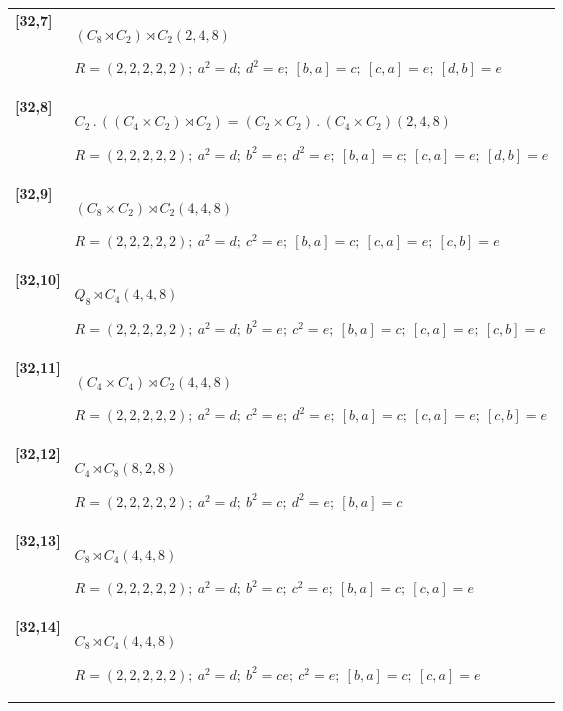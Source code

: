 \documentclass[UTF8,fontset=fandol,11pt,a4paper]{ctexart}
\begin{document}
\begin{longtable}{@{}p{17mm}>{\raggedright\arraybackslash}p{141mm}@{}}
\textbf{[32,7]} & $(C_{8}\rtimes C_{2})\rtimes C_{2}$\quad $(2,4,8)$\par\(R=(2,2,2,2,2);\allowbreak\ a^{2}=d;\allowbreak\ d^{2}=e;\allowbreak\ [b,a]=c;\allowbreak\ [c,a]=e;\allowbreak\ [d,b]=e\)\\[3pt]

\textbf{[32,8]} & $C_{2}\mathbin{.} ((C_{4}\times C_{2})\rtimes C_{2}) = (C_{2}\times C_{2})\mathbin{.} (C_{4}\times C_{2})$\quad $(2,4,8)$\par\(R=(2,2,2,2,2);\allowbreak\ a^{2}=d;\allowbreak\ b^{2}=e;\allowbreak\ d^{2}=e;\allowbreak\ [b,a]=c;\allowbreak\ [c,a]=e;\allowbreak\ [d,b]=e\)\\[3pt]

\textbf{[32,9]} & $(C_{8}\times C_{2})\rtimes C_{2}$\quad $(4,4,8)$\par\(R=(2,2,2,2,2);\allowbreak\ a^{2}=d;\allowbreak\ c^{2}=e;\allowbreak\ [b,a]=c;\allowbreak\ [c,a]=e;\allowbreak\ [c,b]=e\)\\[3pt]

\textbf{[32,10]} & $Q_{8}\rtimes C_{4}$\quad $(4,4,8)$\par\(R=(2,2,2,2,2);\allowbreak\ a^{2}=d;\allowbreak\ b^{2}=e;\allowbreak\ c^{2}=e;\allowbreak\ [b,a]=c;\allowbreak\ [c,a]=e;\allowbreak\ [c,b]=e\)\\[3pt]

\textbf{[32,11]} & $(C_{4}\times C_{4})\rtimes C_{2}$\quad $(4,4,8)$\par\(R=(2,2,2,2,2);\allowbreak\ a^{2}=d;\allowbreak\ c^{2}=e;\allowbreak\ d^{2}=e;\allowbreak\ [b,a]=c;\allowbreak\ [c,a]=e;\allowbreak\ [c,b]=e\)\\[3pt]

\textbf{[32,12]} & $C_{4}\rtimes C_{8}$\quad $(8,2,8)$\par\(R=(2,2,2,2,2);\allowbreak\ a^{2}=d;\allowbreak\ b^{2}=c;\allowbreak\ d^{2}=e;\allowbreak\ [b,a]=c\)\\[3pt]

\textbf{[32,13]} & $C_{8}\rtimes C_{4}$\quad $(4,4,8)$\par\(R=(2,2,2,2,2);\allowbreak\ a^{2}=d;\allowbreak\ b^{2}=c;\allowbreak\ c^{2}=e;\allowbreak\ [b,a]=c;\allowbreak\ [c,a]=e\)\\[3pt]

\textbf{[32,14]} & $C_{8}\rtimes C_{4}$\quad $(4,4,8)$\par\(R=(2,2,2,2,2);\allowbreak\ a^{2}=d;\allowbreak\ b^{2}=ce;\allowbreak\ c^{2}=e;\allowbreak\ [b,a]=c;\allowbreak\ [c,a]=e\)\\[3pt]


\end{longtable}
\end{document}

